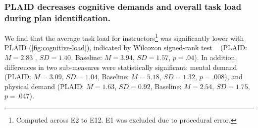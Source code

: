 


\subsubsection{PLAID decreases cognitive demands and overall task load during plan identification.}

We find that the average task load for instructors\footnote{Computed across E2 to E12. E1 was excluded due to procedural error.} was significantly lower with PLAID (\cref{fig:cognitive-load}), indicated by Wilcoxon signed-rank test ~\cite{wilcoxon1992individual} (PLAID: $M = 2.83$ , $SD = 1.40$, Baseline: $M = 3.94$, $SD = 1.57$, $p = .04$). In addition, differences in two sub-measures were statistically significant: mental demand (PLAID: $M = 3.09$, $SD = 1.04$, Baseline: $M = 5.18$, $SD = 1.32$, $p = .008$), and physical demand (PLAID: $M = 1.63$, $SD = 0.92$, Baseline: $M = 2.54$, $SD = 1.75$, $p = .047$).

